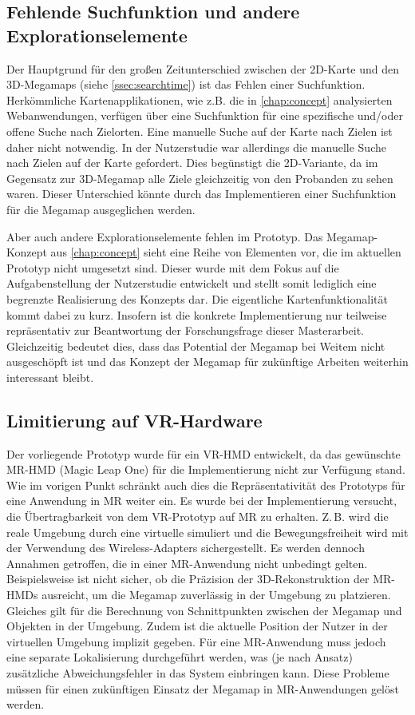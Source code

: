 \subsection*{Fehlende Suchfunktion und andere Explorationselemente}
Der Hauptgrund für den großen Zeitunterschied zwischen der 2D-Karte und den 3D-Megamaps (siehe \autoref{ssec:searchtime}) ist das Fehlen einer Suchfunktion.
Herkömmliche Kartenapplikationen, wie z.B. die in \autoref{chap:concept} analysierten Webanwendungen, verfügen über eine Suchfunktion für eine spezifische und/oder offene Suche nach Zielorten.
Eine manuelle Suche auf der Karte nach Zielen ist daher nicht notwendig.
In der Nutzerstudie war allerdings die manuelle Suche nach Zielen auf der Karte gefordert.
Dies begünstigt die 2D-Variante, da im Gegensatz zur 3D-Megamap alle Ziele gleichzeitig von den Probanden zu sehen waren.
Dieser Unterschied könnte durch das Implementieren einer Suchfunktion für die Megamap ausgeglichen werden.

Aber auch andere Explorationselemente fehlen im Prototyp.
Das Megamap-Konzept aus \autoref{chap:concept} sieht eine Reihe von Elementen vor, die im aktuellen Prototyp nicht umgesetzt sind.
Dieser wurde mit dem Fokus auf die Aufgabenstellung der Nutzerstudie entwickelt und stellt somit lediglich eine begrenzte Realisierung des Konzepts dar.
Die eigentliche Kartenfunktionalität kommt dabei zu kurz.
Insofern ist die konkrete Implementierung nur teilweise repräsentativ zur Beantwortung der Forschungsfrage dieser Masterarbeit.
Gleichzeitig bedeutet dies, dass das Potential der Megamap bei Weitem nicht ausgeschöpft ist und das Konzept der Megamap für zukünftige Arbeiten weiterhin interessant bleibt.

\subsection*{Limitierung auf VR-Hardware}
Der vorliegende Prototyp wurde für ein VR-HMD entwickelt, da das gewünschte MR-HMD (Magic Leap One) für die Implementierung nicht zur Verfügung stand.
Wie im vorigen Punkt schränkt auch dies die Repräsentativität des Prototyps für eine Anwendung in MR weiter ein.
Es wurde bei der Implementierung versucht, die Übertragbarkeit von dem VR-Prototyp auf MR zu erhalten.
Z.\,B. wird die reale Umgebung durch eine virtuelle simuliert und die Bewegungsfreiheit wird mit der Verwendung des Wireless-Adapters sichergestellt.
Es werden dennoch Annahmen getroffen, die in einer MR-Anwendung nicht unbedingt gelten.
Beispielsweise ist nicht sicher, ob die Präzision der 3D-Rekonstruktion der MR-HMDs ausreicht, um die Megamap zuverlässig in der Umgebung zu platzieren.
Gleiches gilt für die Berechnung von Schnittpunkten zwischen der Megamap und Objekten in der Umgebung.
Zudem ist die aktuelle Position der Nutzer in der virtuellen Umgebung implizit gegeben.
Für eine MR-Anwendung muss jedoch eine separate Lokalisierung durchgeführt werden, was (je nach Ansatz) zusätzliche Abweichungsfehler in das System einbringen kann.
Diese Probleme müssen für einen zukünftigen Einsatz der Megamap in MR-Anwendungen gelöst werden.

